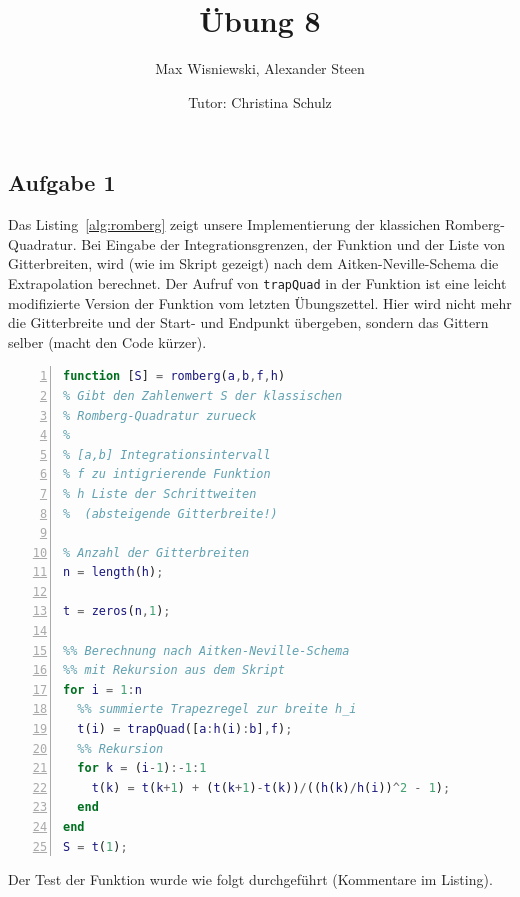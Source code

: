 \documentclass[11pt,a4paper,ngerman]{article}
\date{Tutor: Christina Schulz}
\title{Übung 8}
\author{Max Wisniewski, Alexander Steen}
\begin{document}

\renewcommand{\figurename}{Figure}

\maketitle
\thispagestyle{fancy}

\subsection*{Aufgabe 1}
Das Listing~\ref{alg:romberg} zeigt unsere Implementierung der klassichen Romberg-Quadratur.
Bei Eingabe der Integrationsgrenzen, der Funktion und der Liste von Gitterbreiten, wird (wie 
im Skript gezeigt) nach dem Aitken-Neville-Schema die Extrapolation berechnet.
Der Aufruf von \texttt{trapQuad} in der Funktion ist eine leicht modifizierte Version der Funktion vom letzten Übungszettel. Hier wird nicht mehr die Gitterbreite und der Start- und Endpunkt übergeben, sondern das Gittern selber (macht den Code kürzer).

\begin{lstlisting}[language=matlab, numbers=left, caption=Klassische Romberg-Quadratur, label=alg:romberg]
function [S] = romberg(a,b,f,h)
% Gibt den Zahlenwert S der klassischen
% Romberg-Quadratur zurueck
%
% [a,b] Integrationsintervall
% f zu intigrierende Funktion
% h Liste der Schrittweiten
%  (absteigende Gitterbreite!)

% Anzahl der Gitterbreiten
n = length(h);

t = zeros(n,1);

%% Berechnung nach Aitken-Neville-Schema
%% mit Rekursion aus dem Skript
for i = 1:n
  %% summierte Trapezregel zur breite h_i
  t(i) = trapQuad([a:h(i):b],f);
  %% Rekursion
  for k = (i-1):-1:1
    t(k) = t(k+1) + (t(k+1)-t(k))/((h(k)/h(i))^2 - 1);
  end
end
S = t(1);
\end{lstlisting}

Der Test der Funktion wurde wie folgt durchgeführt (Kommentare im Listing).
\end{document}
